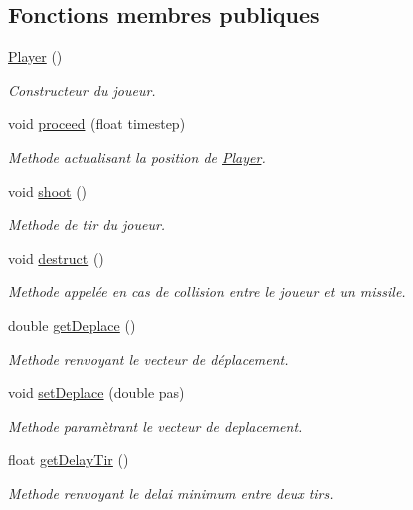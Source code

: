 \subsection*{Fonctions membres publiques}
\begin{DoxyCompactItemize}
\item 
\hyperlink{class_player_a712a726b07cf901c040116d6d0c5cc66}{Player} ()
\begin{DoxyCompactList}\small\item\em Constructeur du joueur. \end{DoxyCompactList}\item 
void \hyperlink{class_player_a9a32aeb96a7184620e3342244e6d17ad}{proceed} (float timestep)
\begin{DoxyCompactList}\small\item\em Methode actualisant la position de \hyperlink{class_player}{Player}. \end{DoxyCompactList}\item 
void \hyperlink{class_player_adff9fbff40a2ad4a8fa2b89884e6e7d2}{shoot} ()
\begin{DoxyCompactList}\small\item\em Methode de tir du joueur. \end{DoxyCompactList}\item 
void \hyperlink{class_player_acab62e8dde064015d176aae75fdcd263}{destruct} ()
\begin{DoxyCompactList}\small\item\em Methode appelée en cas de collision entre le joueur et un missile. \end{DoxyCompactList}\item 
double \hyperlink{class_player_acce5669fa54c5a76c5e69ad890ded0a6}{get\-Deplace} ()
\begin{DoxyCompactList}\small\item\em Methode renvoyant le vecteur de déplacement. \end{DoxyCompactList}\item 
void \hyperlink{class_player_ae3de1d7541e006a1835428ea05d8ac5c}{set\-Deplace} (double pas)
\begin{DoxyCompactList}\small\item\em Methode paramètrant le vecteur de deplacement. \end{DoxyCompactList}\item 
float \hyperlink{class_player_af3f440fabf4174f321e854ff8fabd25a}{get\-Delay\-Tir} ()
\begin{DoxyCompactList}\small\item\em Methode renvoyant le delai minimum entre deux tirs. \end{DoxyCompactList}\item 

\end{DoxyCompactItemize}
